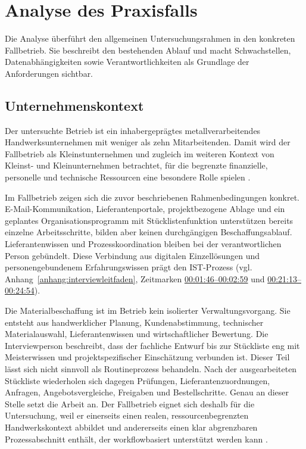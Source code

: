 \documentclass[a4paper,12pt]{article}
\begin{document}
\clearpage
\section{Analyse des Praxisfalls}
Die Analyse überführt den allgemeinen Untersuchungsrahmen in den konkreten Fallbetrieb. Sie beschreibt den bestehenden Ablauf und macht Schwachstellen, Datenabhängigkeiten sowie Verantwortlichkeiten als Grundlage der Anforderungen sichtbar.

\subsection{Unternehmenskontext}
Der untersuchte Betrieb ist ein inhabergeprägtes metallverarbeitendes Handwerksunternehmen mit weniger als zehn Mitarbeitenden. Damit wird der Fallbetrieb als Kleinstunternehmen und zugleich im weiteren Kontext von Kleinst- und Kleinunternehmen betrachtet, für die begrenzte finanzielle, personelle und technische Ressourcen eine besondere Rolle spielen \parencite{beuchel_digitalisierung_2024,oecd_digital_2021}.

Im Fallbetrieb zeigen sich die zuvor beschriebenen Rahmenbedingungen konkret. E-Mail-Kommunikation, Lieferantenportale, projektbezogene Ablage und ein geplantes Organisationsprogramm mit Stücklistenfunktion unterstützen bereits einzelne Arbeitsschritte, bilden aber keinen durchgängigen Beschaffungsablauf. Lieferantenwissen und Prozesskoordination bleiben bei der verantwortlichen Person gebündelt. Diese Verbindung aus digitalen Einzellösungen und personengebundenem Erfahrungswissen prägt den IST-Prozess (vgl. Anhang~\ref{anhang:interviewleitfaden}, Zeitmarken \hyperlink{itv:rolle-materialbestellung}{00:01:46--00:02:59} und \hyperlink{itv:digitale-werkzeuge}{00:21:13--00:24:54}).

Die Materialbeschaffung ist im Betrieb kein isolierter Verwaltungsvorgang. Sie entsteht aus handwerklicher Planung, Kundenabstimmung, technischer Materialauswahl, Lieferantenwissen und wirtschaftlicher Bewertung. Die Interviewperson beschreibt, dass der fachliche Entwurf bis zur Stückliste eng mit Meisterwissen und projektspezifischer Einschätzung verbunden ist. Dieser Teil lässt sich nicht sinnvoll als Routineprozess behandeln. Nach der ausgearbeiteten Stückliste wiederholen sich dagegen Prüfungen, Lieferantenzuordnungen, Anfragen, Angebotsvergleiche, Freigaben und Bestellschritte. Genau an dieser Stelle setzt die Arbeit an. Der Fallbetrieb eignet sich deshalb für die Untersuchung, weil er einerseits einen realen, ressourcenbegrenzten Handwerkskontext abbildet und andererseits einen klar abgrenzbaren Prozessabschnitt enthält, der workflowbasiert unterstützt werden kann \parencite{beuchel_digitalisierung_2024}.
\end{document}
